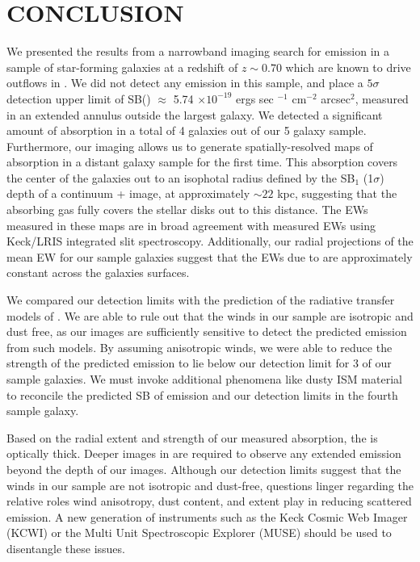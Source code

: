 \documentclass[twocolumn]{aastex61}
\begin{document}
\section{CONCLUSION}\label{sec:conclusion}
We presented the results from a narrowband imaging search for  emission in a sample of star-forming galaxies at a redshift of $z \sim 0.70$ which are known to drive outflows in  . We did not detect any  emission in this sample, and place a $5\sigma$ detection upper limit of SB() $\approx$ 5.74 $\times 10^{-19}$ ergs sec $^{-1}$ cm$^{-2}$ arcsec$^2$, measured in an extended annulus outside the largest galaxy. We detected a significant amount of  absorption in a total of 4 galaxies out of our 5 galaxy sample. Furthermore, our imaging allows us to generate spatially-resolved maps of  absorption in a distant galaxy sample for the first time. This absorption covers the center of the galaxies out to an isophotal radius defined by the SB$_1$ (1$\sigma$) depth of a continuum +  image, at approximately $\sim 22$ kpc, suggesting that the absorbing gas fully covers the stellar disks out to this distance. The EWs measured in these maps are in broad agreement with measured EWs using Keck/LRIS integrated slit spectroscopy. Additionally, our radial projections of the mean EW for our sample galaxies suggest that the EWs due to  are approximately constant across the galaxies surfaces. 

We compared our detection limits with the prediction of the radiative transfer models of \cite{Prochaska_2011}. We are able to rule out that the winds in our sample are isotropic and dust free, as our images are sufficiently sensitive to detect the predicted emission from such models. By assuming anisotropic winds, we were able to reduce the strength of the predicted emission to lie below our detection limit for 3 of our sample galaxies. We must invoke additional phenomena like dusty ISM material 
to reconcile the predicted SB of emission and our detection limits in the fourth sample galaxy. 


Based on the radial extent and strength of our measured  absorption, the  is optically thick. Deeper images in  are required to observe any extended emission beyond the depth of our images.  Although our detection limits suggest that the winds in our sample are not isotropic and dust-free, questions linger regarding the relative roles wind anisotropy, dust content, and extent play in reducing scattered emission.
A new generation of instruments such as the Keck Cosmic Web Imager (KCWI) or the Multi Unit Spectroscopic Explorer (MUSE) should be used to disentangle these issues.
\end{document}
